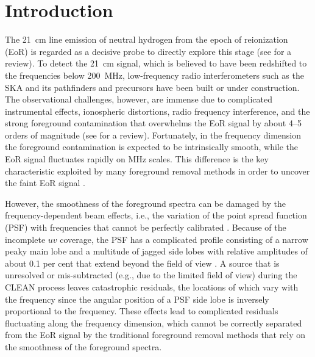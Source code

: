 \documentclass[fleqn,usenatbib]{mnras}
\begin{document}
\section{Introduction}
\label{sec:intro}

The \SI{21}{\cm} line emission of neutral hydrogen from the epoch of
reionization (EoR) is regarded as a decisive probe to directly explore
this stage (see \citealt{furlanetto2016rev} for a review).
To detect the \SI{21}{\cm} signal, which is believed to have been
redshifted to the frequencies below \SI{200}{\MHz}, low-frequency
radio interferometers such as the SKA \citep{koopmans2015rev} and its
pathfinders and precursors have been built or under construction.
The observational challenges, however, are immense due to
complicated instrumental effects, ionospheric distortions, radio frequency
interference, and the strong foreground contamination that
overwhelms the EoR signal by about \numrange{4}{5} orders of magnitude
(see \citealt{morales2010rev} for a review).
Fortunately, in the frequency dimension the foreground contamination
is expected to be intrinsically smooth, while the EoR signal fluctuates
rapidly on \si{\MHz} scales.
This difference is the key characteristic exploited by many foreground
removal methods in order to uncover the faint EoR signal
\citep[e.g.,][]{wang2006,jelic2008,harker2009,liu2009fgrm,%
  chapman2012,chapman2013,gu2013,wang2013,bonaldi2015,mertens2018}.

However, the smoothness of the foreground spectra can be damaged
by the frequency-dependent beam effects, i.e., the variation of the point
spread function (PSF) with frequencies that cannot be perfectly
calibrated \citep{liu2009ps}.
Because of the incomplete $uv$ coverage,
the PSF has a complicated profile consisting of a narrow peaky main lobe
and a multitude of jagged side lobes with relative amplitudes of about
0.1 per cent that extend beyond the field of view
\citep[e.g.,][their figs 1 and 3]{liu2009ps}.
A source that is unresolved or mis-subtracted (e.g., due to the limited
field of view) during the CLEAN process leaves catastrophic residuals,
the locations of which vary with the frequency since the angular
position of a PSF side lobe is inversely proportional to the frequency.
These effects lead to complicated residuals fluctuating along the
frequency dimension, which cannot be correctly separated from the EoR
signal by the traditional foreground removal methods that rely on
the smoothness of the foreground spectra.
\end{document}

